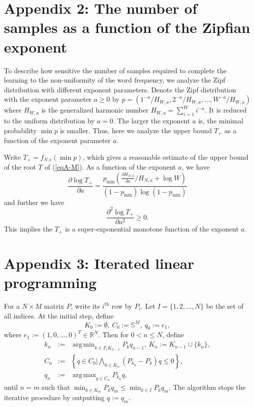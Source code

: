 \documentclass[a4paper,natbib,man]{apa6}
\newcommand{\Simplex}[1]{\mathbb{S}^{#1}}
\DeclareMathOperator*{\argmin}{arg\,min} %
\DeclareMathOperator*{\argmax}{arg\,max} %
\begin{document}
\section{Appendix 2: The number of samples as a function of the Zipfian exponent}
To describe how sensitive the number of samples required to complete the learning to the non-uniformity of the word frequency, we analyze the Zipf distribution with different exponent parameters.
Denote the Zipf distribution with the exponent parameter $a \ge 0$ 
by $p = (1^{-a}/H_{W,a}, 2^{-a}/H_{W,a}, \ldots, W^{-a}/ H_{W,a})$
where $H_{W,a}$ is the generalized harmonic number $H_{W,a} = \sum_{i=1}^{W}i^{-a}$.
It is reduced to the uniform distribution by $a = 0$.
The larger the exponent $a$ is, the minimal probability $\min p$ is smaller.
Thus, here we analyze the upper bound $T_{+}$ as a function of the exponent parameter $a$.

Write $T_{+} = f_{N, \epsilon}( \min p )$, which gives a reasonable estimate of the upper bound of the root $T$ of (\ref{eqA-M}).
As a function of the exponent $a$, we have 
\[
 \frac{\partial \log T_{+} %
 }{ \partial a }
= 
 \frac{ 
p_{\min} 
\left( \frac{ \partial H_{N, a} }{ \partial a}/ H_{N, a} + \log W \right)
}{ ( 1 - p_{\min} ) \log\left( 1 - p_{\min} \right) } 
\]
and further we have
\[
 \frac{\partial^2 \log T_{+} %
 }{ \partial a^2 }
\ge 0.
\]
This implies the $T_{+}$ is a super-exponential monotone function of the exponent $a$.

\section{Appendix 3: Iterated linear programming}
For a $N \times M$ matrix $P$, write its $i^{\text{th}}$ row by $P_{i}$.
Let $I = \{1, 2, \ldots, N\}$ be the set of all indices.
At the initial step, define 
\[
K_{0} := \emptyset,\ C_{0} := \Simplex{M},\ q_{0} := e_{1},
\]
where $e_{1} := (1, 0, \ldots, 0 )^{T} \in \mathbb{R}^{N}$.
Then for $0 < n \le N$, 
define
\begin{eqnarray}
\nonumber
k_{n} &:=& \argmin_{k \in I \setminus K_{n-1}} P_{k} q_{n-1},\ K_{n} := K_{n-1} \cup \{k_n\},
\\
\nonumber
C_{n} &:=& \left\{q \in C_{0} | \bigwedge_{k \in K_{n}}(P_{k_{n}} - P_{k})q\le 0 \right\},
\\
\nonumber
q_{n} &:=& \argmax_{q \in C_{n}} P_{k_n}q,
\end{eqnarray}
until $n = m$ such that 
$\min_{k \in K_{m}} P_{k} q_{m} \le \min_{k \in I } P_{k} q_{m}$.
The algorithm stops the iterative procedure by outputting $q:= q_{m}$.
\end{document}
